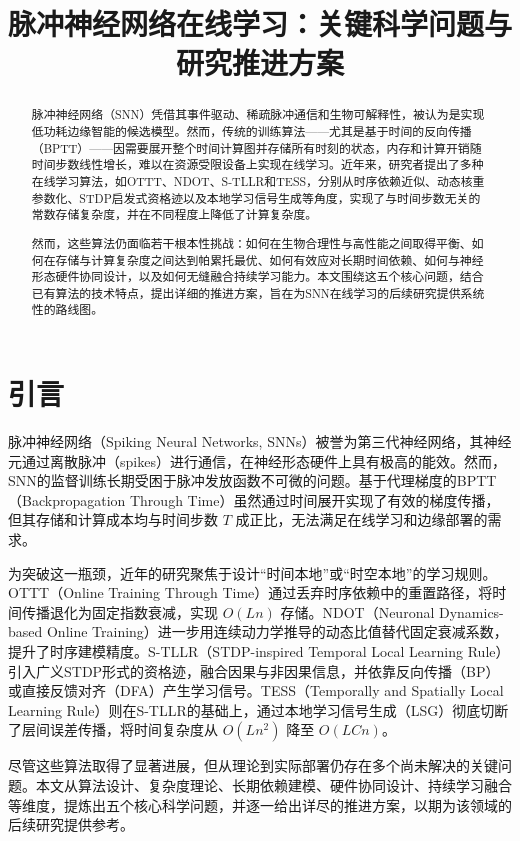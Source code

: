 \documentclass{article}
\title{脉冲神经网络在线学习：关键科学问题与研究推进方案}
\author{}
\date{}
\begin{document}
\maketitle

\begin{abstract}
脉冲神经网络（SNN）凭借其事件驱动、稀疏脉冲通信和生物可解释性，被认为是实现低功耗边缘智能的候选模型。然而，传统的训练算法——尤其是基于时间的反向传播（BPTT）——因需要展开整个时间计算图并存储所有时刻的状态，内存和计算开销随时间步数线性增长，难以在资源受限设备上实现在线学习。近年来，研究者提出了多种在线学习算法，如OTTT、NDOT、S-TLLR和TESS，分别从时序依赖近似、动态核重参数化、STDP启发式资格迹以及本地学习信号生成等角度，实现了与时间步数无关的常数存储复杂度，并在不同程度上降低了计算复杂度。

然而，这些算法仍面临若干根本性挑战：如何在生物合理性与高性能之间取得平衡、如何在存储与计算复杂度之间达到帕累托最优、如何有效应对长期时间依赖、如何与神经形态硬件协同设计，以及如何无缝融合持续学习能力。本文围绕这五个核心问题，结合已有算法的技术特点，提出详细的推进方案，旨在为SNN在线学习的后续研究提供系统性的路线图。
\end{abstract}

\section{引言}

脉冲神经网络（Spiking Neural Networks, SNNs）被誉为第三代神经网络，其神经元通过离散脉冲（spikes）进行通信，在神经形态硬件上具有极高的能效。然而，SNN的监督训练长期受困于脉冲发放函数不可微的问题。基于代理梯度的BPTT（Backpropagation Through Time）虽然通过时间展开实现了有效的梯度传播，但其存储和计算成本均与时间步数 \(T\) 成正比，无法满足在线学习和边缘部署的需求。

为突破这一瓶颈，近年的研究聚焦于设计“时间本地”或“时空本地”的学习规则。OTTT（Online Training Through Time）通过丢弃时序依赖中的重置路径，将时间传播退化为固定指数衰减，实现 \(O(Ln)\) 存储。NDOT（Neuronal Dynamics-based Online Training）进一步用连续动力学推导的动态比值替代固定衰减系数，提升了时序建模精度。S-TLLR（STDP-inspired Temporal Local Learning Rule）引入广义STDP形式的资格迹，融合因果与非因果信息，并依靠反向传播（BP）或直接反馈对齐（DFA）产生学习信号。TESS（Temporally and Spatially Local Learning Rule）则在S-TLLR的基础上，通过本地学习信号生成（LSG）彻底切断了层间误差传播，将时间复杂度从 \(O(Ln^2)\) 降至 \(O(LCn)\)。

尽管这些算法取得了显著进展，但从理论到实际部署仍存在多个尚未解决的关键问题。本文从算法设计、复杂度理论、长期依赖建模、硬件协同设计、持续学习融合等维度，提炼出五个核心科学问题，并逐一给出详尽的推进方案，以期为该领域的后续研究提供参考。
\end{document}
